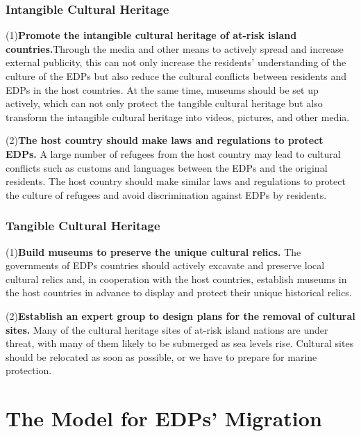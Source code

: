\documentclass[12pt]{article}  %
\begin{document}
\subsubsection{Intangible Cultural Heritage}

(1)\textbf{Promote the intangible cultural heritage of at-risk island countries.}Through the media and other means to actively spread and increase external publicity, this can not only increase the residents' understanding of the culture of the EDPs but also reduce the cultural conflicts between residents and EDPs in the host countries. At the same time, museums should be set up actively, which can not only protect the tangible cultural heritage but also transform the intangible cultural heritage into videos, pictures, and other media.


(2)\textbf{The host country should make laws and regulations to protect EDPs.} A large number of refugees from the host country may lead to cultural conflicts such as customs and languages between the EDPs and the original residents. The host country should make similar laws and regulations to protect the culture of refugees and avoid discrimination against EDPs by residents.







\subsubsection{Tangible Cultural Heritage}

(1)\textbf{Build museums to preserve the unique cultural relics.} The governments of EDPs countries should actively excavate and preserve local cultural relics and, in cooperation with the host countries, establish museums in the host countries in advance to display and protect their unique historical relics.



(2)\textbf{Establish an expert group to design plans for the removal of cultural sites.} Many of the cultural heritage sites of at-risk island nations are under threat, with many of them likely to be submerged as sea levels rise. Cultural sites should be relocated as soon as possible, or we have to prepare for marine protection. 



\section{The Model for EDPs’ Migration}
\end{document}
